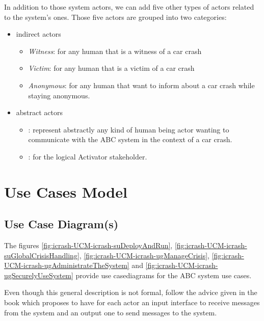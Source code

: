 In addition to those system actors, we can add five other types of actors related to the system's ones. Those five actors are grouped into two categories:
\begin{itemize}
  \item \Glspl{indirect actor}  
  \begin{itemize}
    \item \textit{Witness}: for any human that is a witness of a car crash
    \item \textit{Victim}: for any human that is a victim of a car crash
    \item \textit{Anonymous}: for any human that want to inform about a car crash while staying anonymous.
  \end{itemize}
  
  \item \Glspl{abstract actor}
	\begin{itemize}
    \item {}: represent abstractly any kind of human being actor wanting to communicate with the ABC system in the context of a car crash.
    \item {}: for the logical Activator stakeholder.
  \end{itemize}

\end{itemize}


\clearpage
\section{Use Cases Model}
\label{sec:lu.uni.lassy.excalibur.examples.icrash-gendescr-usecasemodel}

\subsection{Use Case Diagram(s)}

The figures \ref{fig:icrash-UCM-icrash-suDeployAndRun}, \ref{fig:icrash-UCM-icrash-suGlobalCrisisHandling}, \ref{fig:icrash-UCM-icrash-ugManageCrisis}, \ref{fig:icrash-UCM-icrash-ugAdministrateTheSystem} and \ref{fig:icrash-UCM-icrash-ugSecurelyUseSystem} provide \msrmessir use casediagrams for the ABC system use cases.

Even though this general description is not formal, follow the advice given in the \msrmessir book \cite{messirbook} which proposes to have for each actor an input interface to receive messages from the system and an output one to send messages to the system.

